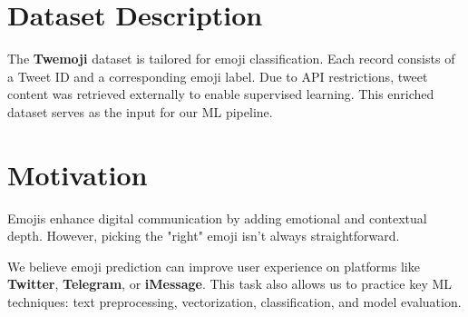 \documentclass[11pt]{article}
\begin{document}
\section{Dataset Description}
The \textbf{Twemoji} dataset is tailored for emoji classification. Each record consists of a Tweet ID and a corresponding emoji label. Due to API restrictions, tweet content was retrieved externally to enable supervised learning. This enriched dataset serves as the input for our ML pipeline.

\section{Motivation}
Emojis enhance digital communication by adding emotional and contextual depth. However, picking the "right" emoji isn't always straightforward.

We believe emoji prediction can improve user experience on platforms like \textbf{Twitter}, \textbf{Telegram}, or \textbf{iMessage}. This task also allows us to practice key ML techniques: text preprocessing, vectorization, classification, and model evaluation.
\end{document}
